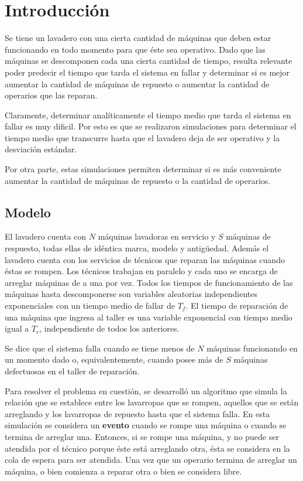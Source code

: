 \section{\textbf{Introducción}}

    \par Se tiene un lavadero con una cierta cantidad de máquinas que deben
    estar funcionando en todo momento para que éste sea operativo. Dado
    que las máquinas se descomponen cada una cierta cantidad de tiempo,
    resulta relevante poder predecir el tiempo que tarda el sistema en fallar
    y determinar si es mejor aumentar la cantidad de máquinas de repuesto o
    aumentar la cantidad de operarios que las reparan.

    \par Claramente, determinar analíticamente el tiempo medio que tarda el
    sistema en fallar es muy dificil. Por esto es que se realizaron simulaciones
    para determinar el tiempo medio que transcurre hasta que el lavadero deja
    de ser operativo y la desviación estándar.

    \par Por otra parte, estas simulaciones permiten determinar si es más
    conveniente aumentar la cantidad de máquinas de repuesto o la cantidad de
    operarios.


    \subsection{Modelo}

    \par El lavadero cuenta con $N$ máquinas lavadoras en servicio y $S$
    máquinas de respuesto, todas ellas de idéntica marca, modelo y antigüedad.
    Además el lavadero cuenta con los servicios de técnicos que reparan
    las máquinas cuando éstas se rompen. Los técnicos trabajan en paralelo y
    cada uno se encarga de arreglar máquinas de a una por vez.
    Todos los tiempos de funcionamiento de las máquinas hasta descomponerse
    son variables aleatorias independientes exponenciales con un tiempo medio de
    fallar de $T_f$.
    El tiempo de reparación de una máquina que ingresa al taller es una
    variable exponencial con tiempo medio igual a $T_r$, independiente de todos
    los anteriores.

    \par Se dice que el sistema falla cuando se tiene menos de $N$ máquinas
    funcionando en un momento dado o, equivalentemente, cuando posee más de $S$
    máquinas defectuosas en el taller de reparación.

    \par Para resolver el problema en cuestión, se desarrolló un algoritmo que
    simula la relación que se establece entre los lavarropas que se rompen,
    aquellos que se están arreglando y los lavarropas de repuesto hasta que el
    sistema falla.
    En esta simulación se considera un \textbf{evento} cuando se rompe una máquina
    o cuando se termina de arreglar una.
    Entonces, si se rompe una máquina, y no puede ser atendida por el
    técnico porque éste está arreglando otra, ésta se considera en la cola de
    espera para ser atendida. Una vez que un operario termina de arreglar un
    máquina, o bien comienza a reparar otra o bien se considera libre.
